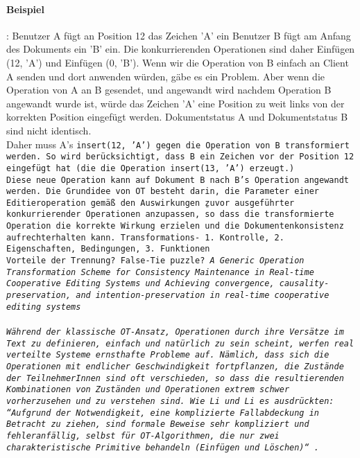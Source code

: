 \paragraph{Beispiel}:
Benutzer A fügt an Position 12 das Zeichen 'A' ein
Benutzer B fügt am Anfang des Dokuments ein 'B' ein.
Die konkurrierenden Operationen sind daher Einfügen (12, 'A') und Einfügen (0, 'B').
Wenn wir die Operation von B einfach an Client A senden und dort anwenden würden, gäbe es ein Problem.
Aber wenn die Operation von A an B gesendet, und angewandt wird nachdem Operation B angewandt wurde ist, würde das Zeichen 'A' eine Position zu weit links von der korrekten Position eingefügt werden.
Dokumentstatus A und Dokumentstatus B sind nicht identisch.\\
Daher muss A's \tt{insert(12, 'A')} gegen die Operation von B transformiert werden. So wird berücksichtigt, dass B ein Zeichen vor der Position 12 eingefügt hat (die die Operation \tt{insert(13, 'A')} erzeugt.)\\
Diese neue Operation kann auf Dokument B nach B's Operation angewandt werden.
Die Grundidee von \gls{OT} besteht darin, die Parameter einer Editieroperation gemäß den Auswirkungen \b{zuvor ausgeführter} konkurrierender Operationen anzupassen, so dass die transformierte Operation die korrekte Wirkung erzielen und die Dokumentenkonsistenz aufrechterhalten kann.
Transformations- 1. Kontrolle, 2. Eigenschaften, Bedingungen, 3. Funktionen\\
Vorteile der Trennung?
False-Tie puzzle? \it{A Generic Operation Transformation Scheme for Consistency Maintenance in Real-time Cooperative Editing Systems} und \it{Achieving convergence, causality-preservation, and intention-preservation in real-time cooperative editing systems}\\\\
Während der klassische OT-Ansatz, Operationen durch ihre Versätze im Text zu definieren, einfach und natürlich zu sein scheint, werfen real verteilte Systeme ernsthafte Probleme auf. Nämlich, dass sich die Operationen mit endlicher Geschwindigkeit fortpflanzen, die Zustände der TeilnehmerInnen sind oft verschieden, so dass die resultierenden Kombinationen von Zuständen und Operationen extrem schwer vorherzusehen und zu verstehen sind.
Wie Li und Li es ausdrückten: ``Aufgrund der Notwendigkeit, eine komplizierte Fallabdeckung in Betracht zu ziehen, sind formale Beweise sehr kompliziert und fehleranfällig, selbst für OT-Algorithmen, die nur zwei charakteristische Primitive behandeln (Einfügen und Löschen)``~\cite{ot-critic}.\\
